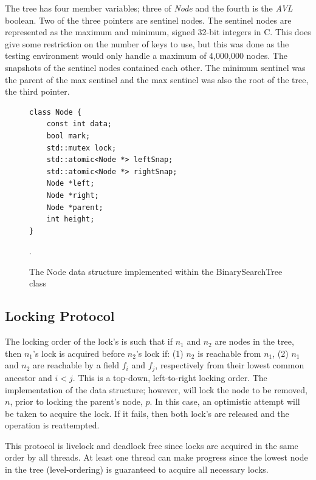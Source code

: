 \documentclass[conference]{IEEEtran}
\theoremstyle{definition}
\theoremstyle{theorem}
\begin{document}
The tree has four member variables; three of \textit{Node} and the fourth is the \textit{AVL} boolean. Two of the three pointers are sentinel nodes. The sentinel nodes are represented as the maximum and minimum, signed 32-bit integers in C. This does give some restriction on the number of keys to use, but this was done as the testing environment would only handle a maximum of 4,000,000 nodes. The snapshots of the sentinel nodes contained each other. The minimum sentinel was the parent of the max sentinel and the max sentinel was also the root of the tree, the third pointer.
\begin{figure}[t]
\centering
\begin{lstlisting}
class Node {
	const int data;
	bool mark;
	std::mutex lock;
	std::atomic<Node *> leftSnap;
	std::atomic<Node *> rightSnap;
	Node *left;
	Node *right;
	Node *parent;
	int height;
}
\end{lstlisting}
\caption{The Node data structure implemented within the BinarySearchTree class}.
\label{fig:node}
\end{figure}

\subsection{Locking Protocol}
The locking order of the lock's is such that if $n_1$ and $n_2$ are nodes in the tree, then $n_1$'s lock is acquired before $n_2$'s lock if: (1) $n_2$ is reachable from $n_1$, (2) $n_1$ and $n_2$ are reachable by a field $f_i$ and $f_j$, respectively from their lowest common ancestor and $i<j$. This is a top-down, left-to-right locking order. The implementation of the data structure; however, will lock the node to be removed, $n$, prior to locking the parent's node, $p$. In this case, an optimistic attempt will be taken to acquire the lock. If it fails, then both lock's are released and the operation is reattempted.

This protocol is livelock and deadlock free since locks are acquired in the same order by all threads. At least one thread can make progress since the lowest node in the tree (level-ordering) is guaranteed to acquire all necessary locks.
\end{document}
